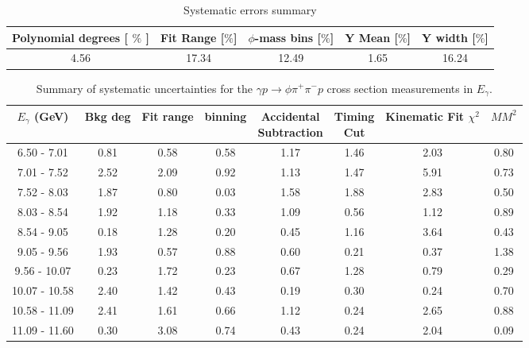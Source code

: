 \begin{table}[!htbp]
    \centering
    \caption{Systematic errors summary}
    \label{tab.4.6}
    \begin{tabular}{|c|c|c|c|c|}
        \hline
        Polynomial degrees [ $\%$ ] & Fit Range [$\%$] & $\phi$-mass bins [$\%$]  & Y Mean [$\%$] & Y width [$\%$] \\
        \hline
        4.56 & 17.34 & 12.49 & 1.65 & 16.24 \\
        \hline
    \end{tabular}
\end{table}

\begin{table}[!htbp]
    \small
    \centering
    \caption{Summary of systematic uncertainties for the $\gamma p \rightarrow \phi \pi^{+} \pi^{-} p$ cross section measurements in $E_{\gamma}$.}
    \label{tab.y2175.syserr.phi2pi.1}
    \begin{tabular}{|c|c|c|c|c|c|c|c|}
        \hline
        $E_{\gamma}$ (GeV)&Bkg deg&Fit range&binning&\thead{Accidental\\Subtraction}&\thead{Timing\\Cut}&\thead{Kinematic\\Fit $\chi^{2}$}&$MM^{2}$\\
        \hline
        6.50 - 7.01 & 0.81 & 0.58 & 0.58 & 1.17 & 1.46 & 2.03 & 0.80 \\
        7.01 - 7.52 & 2.52 & 2.09 & 0.92 & 1.13 & 1.47 & 5.91 & 0.73 \\
        7.52 - 8.03 & 1.87 & 0.80 & 0.03 & 1.58 & 1.88 & 2.83 & 0.50 \\
        8.03 - 8.54 & 1.92 & 1.18 & 0.33 & 1.09 & 0.56 & 1.12 & 0.89 \\
        8.54 - 9.05 & 0.18 & 1.28 & 0.20 & 0.45 & 1.16 & 3.64 & 0.43 \\
        9.05 - 9.56 & 1.93 & 0.57 & 0.88 & 0.60 & 0.21 & 0.37 & 1.38 \\
        9.56 - 10.07 & 0.23 & 1.72 & 0.23 & 0.67 & 1.28 & 0.79 & 0.29 \\
        10.07 - 10.58 & 2.40 & 1.42 & 0.43 & 0.19 & 0.30 & 0.24 & 0.70 \\
        10.58 - 11.09 & 2.41 & 1.61 & 0.66 & 1.12 & 0.24 & 2.65 & 0.88 \\
        11.09 - 11.60 & 0.30 & 3.08 & 0.74 & 0.43 & 0.24 & 2.04 & 0.09 \\
        \hline
    \end{tabular}
\end{table}
   
